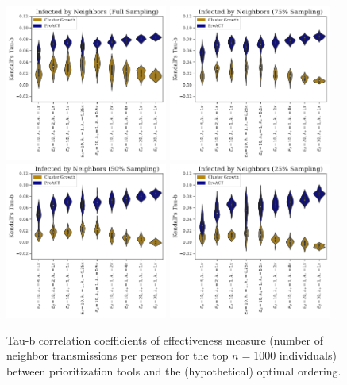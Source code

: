\documentclass[a4paper,11pt]{article}
\begin{document}
\begin{figure}[!h]
\centering
\includegraphics[width=0.475\textwidth]{figs/results_efficacy_tau_neighbors.pdf}
\includegraphics[width=0.475\textwidth]{figs/results_efficacy_tau_neighbors_sub75.pdf}\\
\includegraphics[width=0.475\textwidth]{figs/results_efficacy_tau_neighbors_sub50.pdf}
\includegraphics[width=0.475\textwidth]{figs/results_efficacy_tau_neighbors_sub25.pdf}\\
\caption{{Tau-b correlation coefficients of effectiveness measure (number of neighbor transmissions per person for the top $n=1000$ individuals) between prioritization tools and the (hypothetical) optimal ordering.}}\label{fig:tau-b-values-neighbors}
\end{figure}
\end{document}

